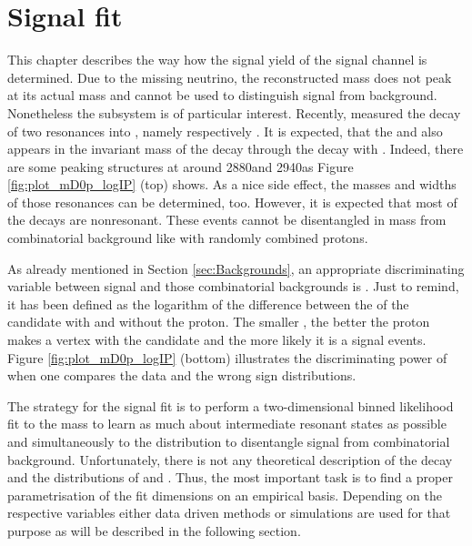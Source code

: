 \chapter{Signal fit}
\label{sec:Signalfit}
This chapter describes the way how the signal yield \NDp of the signal channel \LbToDpmunuX is determined.
Due to the missing neutrino, the reconstructed \Lb mass does not peak at its actual mass and cannot be used to distinguish signal from background.
Nonetheless the \Dz\proton subsystem is of particular interest.
Recently, \babar measured the decay of two \Lc resonances into \Dz\proton, namely \decay{\LcResI}{\Dz\proton} respectively \decay{\LcResII}{\Dz\proton} \cite{BaBar_D0p}.
It is expected, that the \LcResI and \LcResII also appears in the invariant \Dz\proton mass of the decay \LbToDpmunuX through the decay  with .
Indeed, there are some peaking structures at \MDp around 2880\mev and 2940\mev as Figure \ref{fig:plot_mD0p_logIP} (top) shows.
As a nice side effect, the masses and widths of those resonances can be determined, too.
However, it is expected that most of the \LbToDpmunuX decays are nonresonant.
These events cannot be disentangled in \Dz\proton mass from combinatorial background like \BToDmunuX with randomly combined protons.

As already mentioned in Section \ref{sec:Backgrounds}, an appropriate discriminating variable between signal and those combinatorial backgrounds is \logIP.
Just to remind, it has been defined as the logarithm of the difference between the \chisqvtx of the \Dz\mun candidate with and without the proton.
The smaller \logIP, the better the proton makes a vertex with the \Dz\mun candidate and the more likely it is a \LbToDpmunuX signal events.
Figure \ref{fig:plot_mD0p_logIP} (bottom) illustrates the discriminating power of \logIP when one compares the data and the wrong sign distributions.

The strategy for the signal fit is to perform a two-dimensional binned likelihood fit to the \Dz\proton mass to learn as much about intermediate resonant states as possible and simultaneously to the \logIP distribution to disentangle \LbToDpmunuX signal from combinatorial background.
Unfortunately, there is not any theoretical description of the \LbToDpmunuX decay and the distributions of \MDp and \logIP.
Thus, the most important task is to find a proper parametrisation of the fit dimensions on an empirical basis.
Depending on the respective variables either data driven methods or simulations are used for that purpose as will be described in the following section.


